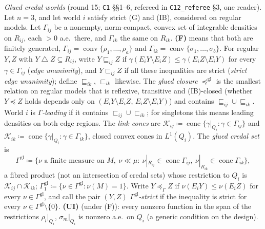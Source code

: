 \documentclass[11pt]{article}
\theoremstyle{definition}
\theoremstyle{remark}
\newcommand{\co}{\operatorname{conv}}
\newcommand{\sd}{\mathbin{\triangle}}
\newcommand{\src}[1]{\texttt{#1}}
\begin{document}
\emph{Glued credal worlds} (round 15; \src{C1} \S\S1--6, refereed in \src{C12\_referee} \S3, one reader). Let $n=3$, and let world $i$ satisfy strict (G) and (IB), considered on regular models. Let $\Gamma_{ij}$ be a nonempty, norm-compact, convex set of integrable densities on $R_{ij}$, each $>0$ a.e.\ there, and $\Gamma_{ik}$ the same on $R_{ik}$. \textbf{(F)} means that both are finitely generated, $\Gamma_{ij}=\co\{\rho_1,\dots,\rho_a\}$ and $\Gamma_{ik}=\co\{\sigma_1,\dots,\sigma_b\}$. For regular $Y,Z$ with $Y\sd Z\subseteq R_{ij}$, write $Y\sqsubseteq_{ij}Z$ if $\gamma(E_iY\setminus E_iZ)\le\gamma(E_iZ\setminus E_iY)$ for every $\gamma\in\Gamma_{ij}$ (\emph{edge unanimity}), and $Y\sqsubset_{ij}Z$ if all these inequalities are strict (\emph{strict edge unanimity}); define $\sqsubseteq_{ik}$, $\sqsubset_{ik}$ likewise. The \emph{glued closure} $\preceq^{\mathrm{gl}}$ is the smallest relation on regular models that is reflexive, transitive and (IB)-closed (whether $Y\preceq Z$ holds depends only on $(E_iY\setminus E_iZ,\,E_iZ\setminus E_iY)$) and contains $\sqsubseteq_{ij}\cup\sqsubseteq_{ik}$. World $i$ is \emph{$\Gamma$-leading} if it contains $\sqsubset_{ij}\cup\sqsubset_{ik}$; for singletons this means leading densities on both edge regions. The \emph{link cones} are $\mathcal K_{ij}\coloneqq\operatorname{cone}\{\gamma|_{Q_i}:\gamma\in\Gamma_{ij}\}$ and $\mathcal K_{ik}\coloneqq\operatorname{cone}\{\gamma|_{Q_i}:\gamma\in\Gamma_{ik}\}$, closed convex cones in $L^1(Q_i)$. The \emph{glued credal set} is
\[
\Gamma^{\mathrm{gl}}\coloneqq\{\nu\text{ a finite measure on }M,\ \nu\ll\mu:\ \nu|_{R_{ij}}\in\operatorname{cone}\Gamma_{ij},\ \nu|_{R_{ik}}\in\operatorname{cone}\Gamma_{ik}\},
\]
a fibred product (not an intersection of credal sets) whose restriction to $Q_i$ is $\mathcal K_{ij}\cap\mathcal K_{ik}$; $\Gamma^{\mathrm{gl}}_1\coloneqq\{\nu\in\Gamma^{\mathrm{gl}}:\nu(M)=1\}$. Write $Y\preceq_\Gamma Z$ if $\nu(E_iY)\le\nu(E_iZ)$ for every $\nu\in\Gamma^{\mathrm{gl}}$, and call the pair $(Y,Z)$ \emph{$\Gamma^{\mathrm{gl}}$-strict} if the inequality is strict for every $\nu\in\Gamma^{\mathrm{gl}}\setminus\{0\}$. \textbf{(UI)} (under (F)): every nonzero function in the span of the restrictions $\rho_l|_{Q_i}$, $\sigma_m|_{Q_i}$ is nonzero a.e.\ on $Q_i$ (a generic condition on the design).
\end{document}
